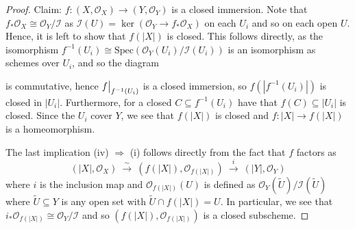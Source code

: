\documentclass{scrartcl}
\newcommand{\Spec}{\mathrm{Spec}}
\renewcommand{\O}{\mathcal{O}}
\newcommand\restr[2]{{
    \left.\kern-\nulldelimiterspace
    #1
    \vphantom{\big|}
    \right|_{#2}
}}
\theoremstyle{definition}
\begin{document}
\begin{proof}
    Claim: $f: (X, \O_X) \to (Y, \O_Y)$ is a closed immersion.
    Note that $f_* \O_X \cong \O_Y / \mathcal{I}$ as $\mathcal{I}(U) = \ker (\O_Y \to f_* \O_X)$ on each $U_i$ and so on each open $U$.
    Hence, it is left to show that $f(|X|)$ is closed.
    This follows directly, as the isomorphism $f^{-1}(U_i) \cong \Spec(\O_Y(U_i)/\mathcal{I}(U_i))$ is an isomorphism as schemes over $U_i$, and so the diagram
    \begin{center}
    \end{center}
    is commutative, hence $\restr{f}{f^{-1}(U_i)}$ is a closed immersion, so $f(|f^{-1}(U_i)|)$ is closed in $|U_i|$.
    Furthermore, for a closed $C \subseteq f^{-1}(U_i)$ have that $f(C) \subseteq |U_i|$ is closed.
    Since the $U_i$ cover $Y$, we see that $f(|X|)$ is closed and $f: |X| \to f(|X|)$ is a homeomorphism.

    The last implication (iv) $\Rightarrow$ (i) follows directly from the fact that $f$ factors as
    \begin{equation*}
        (|X|, \O_X) \ \overset{\sim}{\to} \ (f(|X|), \O_{f(|X|)}) \ \overset{i}{\to} \ (|Y|, \O_Y)
    \end{equation*}
    where $i$ is the inclusion map and $\O_{f(|X|)}(U)$ is defined as $\O_Y(\tilde{U}) / \mathcal{I}(\tilde{U})$ where $\tilde{U} \subseteq Y$ is any open set with $\tilde{U} \cap f(|X|) = U$.
    In particular, we see that $i_*\O_{f(|X|)} \cong \O_Y/\mathcal{I}$ and so $(f(|X|), \O_{f(|X|)})$ is a closed subscheme.
\end{proof}
\end{document}
